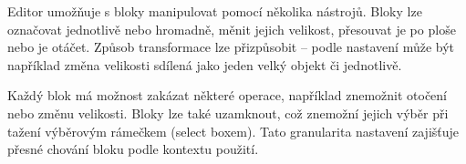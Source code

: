 Editor umožňuje s bloky manipulovat pomocí několika nástrojů. 
Bloky lze označovat jednotlivě nebo hromadně, měnit jejich velikost, přesouvat je po ploše nebo je otáčet. 
Způsob transformace lze přizpůsobit -- podle nastavení může být například změna velikosti sdílená jako jeden velký objekt či jednotlivě.

Každý blok má možnost zakázat některé operace, například znemožnit otočení nebo změnu velikosti. 
Bloky lze také uzamknout, což znemožní jejich výběr při tažení výběrovým rámečkem (select boxem). 
Tato granularita nastavení zajišťuje přesné chování bloku podle kontextu použití.











